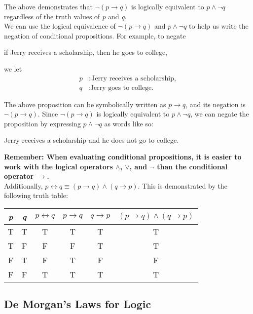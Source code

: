 The above demonstrates that $\lnot (p \rightarrow q)$ is logically equivalent to $p \land \lnot q$ regardless of the truth values of \textit{p} and \textit{q}.\\

We can use the logical equivalence of $\lnot (p \rightarrow q)$ and $p \land \lnot q$ to help us write the negation of conditional propositions.  For example, to negate
\begin{center}
    if Jerry receives a scholarship, then he goes to college,
\end{center}

we let
\begin{align*}
p&: \text{Jerry receives a scholarship},\\
q&: \text{Jerry goes to college.}
\end{align*}

The above proposition can be symbolically written as $p \rightarrow q$, and its negation is $\lnot (p \rightarrow q)$.  Since $\lnot (p \rightarrow q)$ is logically equivalent to $p \land \lnot q$, we can negate the proposition by expressing $p \land \lnot q$ as words like so:
\begin{center}
    Jerry receives a scholarship and he does not go to college.
\end{center}

\textbf{Remember: When evaluating conditional propositions, it is easier to work with the logical operators $\land$, $\vee$, and $\lnot$ than the conditional operator $\rightarrow$.}\\

Additionally, $p \leftrightarrow q \equiv (p \rightarrow q) \land (q \rightarrow p)$.  This is demonstrated by the following truth table:

\begin{table}[h]
\centering
\begin{tabular}{|c|c|c|c|c|c}
\hline
\textit{p} & \textit{q} & $p \leftrightarrow q$ & $p \rightarrow q$ & $q \rightarrow p$ & $(p \rightarrow q) \land (q \rightarrow p)$  \\ \hline
T & T & T & T & T & T \\ \hline
T & F & F & F & T & T \\ \hline
F & T & F & T & F & F \\ \hline
F & F & T & T & T & T \\ \hline
\end{tabular}
\end{table}

\subsection*{De Morgan's Laws for Logic}


